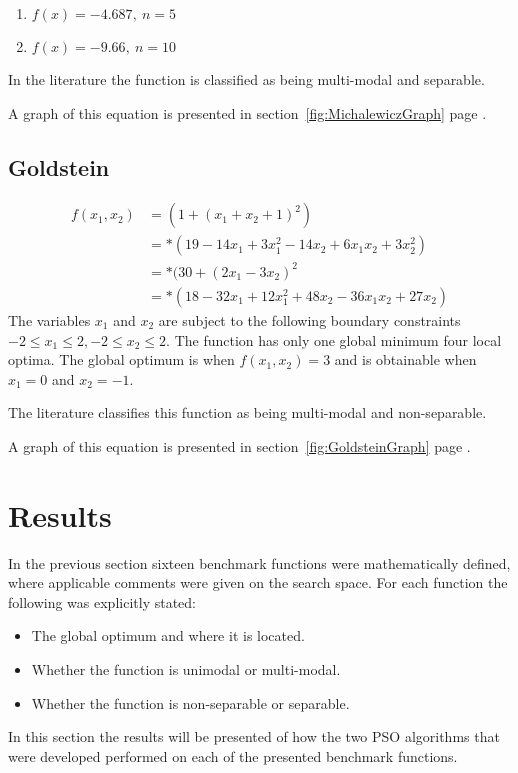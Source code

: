 \begin{enumerate}
\item $f(x) = -4.687,\: n = 5$
\item $f(x) = -9.66,\: n = 10$
\end{enumerate}
In the literature the function is classified as being multi-modal and separable\cite{ABCCompareStudy}.

A graph of this equation is presented in section~\ref{fig:MichalewiczGraph} page \pageref{fig:MichalewiczGraph}.
\subsection{Goldstein}
\begin{align}
	f(x_1,x_2) &= (1 + (x_1 + x_2 + 1)^2)\nonumber\\
			   &=*(19-14x_1+3x_1^2 -14x_2 + 6x_1x_2 + 3x_2^2)\nonumber\\
			   &=*(30 + (2x_1 -3x_2)^2\nonumber\\
			   &=*(18 - 32x_1 + 12x_1^2 +48x_2 -36x_1x_2 + 27x_2)\nonumber
\end{align}
The variables $x_1$ and $x_2$ are subject to the following boundary constraints $-2 \leq x_1 \leq 2, -2 \leq x_2 \leq 2$\cite{ABCCompareStudy,TSGlobalOptimization,TSGlobalOptContinFunc,ContinACSTS,TestFunctions}. The function has only one global minimum four local optima\cite{ABCCompareStudy,TSGlobalOptimization}. The global optimum is when $f(x_1,x_2) = 3$ and is obtainable when $x_1 = 0$ and $x_2 = -1$\cite{ABCCompareStudy,TSGlobalOptimization,TSGlobalOptContinFunc,ContinACSTS,TestFunctions}.

The literature classifies this function as being multi-modal and non-separable\cite{ABCCompareStudy}.

A graph of this equation is presented in section~\ref{fig:GoldsteinGraph} page \pageref{fig:GoldsteinGraph}.

\section{Results}
\label{sec:benchResults}
In the previous section sixteen benchmark functions were mathematically defined, where applicable comments were given on the search space. For each function the following was explicitly stated:
\begin{itemize}
\item The global optimum and where it is located.
\item Whether the function is unimodal or multi-modal.
\item Whether the function is non-separable or separable.
\end{itemize}
In this section the results will be presented of how the two PSO algorithms that were developed performed on each of the presented benchmark functions. 

